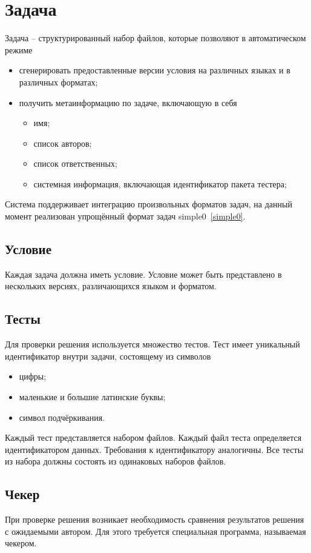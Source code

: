 \section{Задача}
\label{bacsproblem}
Задача -- структурированный набор файлов,
которые позволяют в автоматическом режиме
\begin{itemize}
    \item сгенерировать предоставленные версии условия
        на различных языках и в различных форматах;
    \item получить метаинформацию по задаче, включающую в себя
        \begin{itemize}
            \item имя;
            \item список авторов;
            \item список ответственных;
            \item системная информация, включающая идентификатор пакета тестера;
        \end{itemize}
\end{itemize}

Система поддерживает интеграцию произвольных форматов задач,
на данный момент реализован упрощённый формат задач simple0~\ref{simple0}.

\subsection{Условие}
Каждая задача должна иметь условие. Условие может
быть представлено в нескольких версиях,
различающихся языком и форматом.

\subsection{Тесты}
Для проверки решения используется множество тестов.
Тест имеет уникальный идентификатор внутри задачи,
состоящему из символов
\begin{itemize}
    \item цифры;
    \item маленькие и большие латинские буквы;
    \item символ подчёркивания.
\end{itemize}

Каждый тест представляется набором файлов.
Каждый файл теста определяется идентификатором данных.
Требования к идентификатору аналогичны.
Все тесты из набора должны состоять из одинаковых наборов файлов.

\subsection{Чекер}
При проверке решения возникает необходимость сравнения результатов решения
с ожидаемыми автором. Для этого требуется специальная программа, называемая чекером.

